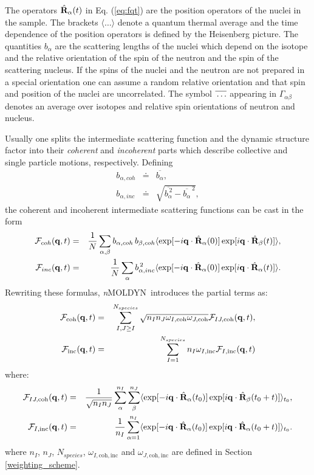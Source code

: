 \documentclass[a4paper,11pt]{report}
\newcommand{\NMOLDYN}{\textit{n}MOLDYN}
\begin{document}
The operators $\hat {\bf R}_\alpha(t)$ in Eq. (\ref{eq:fqt}) are the position operators of the nuclei in the sample. 
The brackets $\langle\ldots\rangle$ denote a quantum thermal average and the time dependence of the position operators 
is defined by the Heisenberg picture.  The quantities $b_\alpha$ are the scattering lengths of the nuclei which depend 
on the isotope and the relative orientation of the spin of the neutron and the spin of the scattering nucleus. If the
spins of the nuclei and the neutron are not prepared in a special orientation one can assume a random relative orientation 
and that spin and position of the nuclei are uncorrelated. The symbol 
$\overline{\rule{0pt}{5pt}\ldots}$ appearing in $\Gamma_{\alpha\beta}$ denotes an average over isotopes and relative spin 
orientations of neutron and nucleus.

Usually one splits the intermediate scattering function and the dynamic structure factor into their {\em coherent} and 
{\em incoherent} parts which describe collective and single particle motions, respectively.
Defining
\begin{eqnarray}
b_{\alpha,coh} &\doteq &\overline{b_\alpha},\\ b_{\alpha,inc} &\doteq
&\sqrt{ \overline{b_\alpha^{\,2}} - \overline{b_\alpha}^{\,2} },
\end{eqnarray}
the coherent and incoherent intermediate scattering functions can be cast in the form
\begin{eqnarray}
{\cal F}_{coh}({\bf q},t) &= &\frac{1}{N}\sum_{\alpha,\beta}
b_{\alpha,coh}\,b_{\beta,coh}
\langle\exp[-i{\bf q}\cdot\hat{\bf R}_\alpha(0)]
       \exp[i{\bf q}\cdot\hat{\bf R}_\beta(t)]\rangle,\\
{\cal F}_{inc}({\bf q},t) &= &\frac{1}{N}\sum_{\alpha}
b_{\alpha,inc}^{\,2}
\langle\exp[-i{\bf q}\cdot\hat{\bf R}_\alpha(0)]
       \exp[i{\bf q}\cdot\hat{\bf R}_\alpha(t)]\rangle.
\end{eqnarray}
Rewriting these formulas, \NMOLDYN\ introduces the partial terms as:
\begin{eqnarray}
\label{eq:fcoh}
{\cal F}_{\mathrm{coh}}({\bf q},t) &= & \sum^{N_{species}}_{I,J \ge I}\sqrt{n_I n_J\omega_{I,\mathrm{coh}}\omega_{J,\mathrm{coh}}}{\cal F}_{IJ,\mathrm{coh}}({\bf q},t),\\
\label{eq:finc}
{\cal F}_{\mathrm{inc}}({\bf q},t) &= &\sum^{N_{species}}_{I = 1}n_I \omega_{I,\mathrm{inc}}{\cal F}_{I,\mathrm{inc}}({\bf q},t)
\end{eqnarray}
where:
\begin{eqnarray}
{\cal F}_{IJ,\mathrm{coh}}({\bf q},t) &= &\frac{1}{\sqrt{n_In_J}}\sum^{n_I}_{\alpha}\sum^{n_J}_{\beta}
\langle\exp[-i{\bf q}\cdot\hat{\bf R}_\alpha(t_0)]
       \exp[i{\bf q}\cdot\hat{\bf R}_\beta(t_0+t)]\rangle_{t_0},\\
{\cal F}_{I,\mathrm{inc}}({\bf q},t) &= & \frac{1}{n_I}\sum^{n_I}_{\alpha = 1}\langle\exp[-i{\bf q}
\cdot\hat{\bf R}_\alpha(t_0)]\exp[i{\bf q}\cdot\hat{\bf R}_\alpha(t_0+t)]\rangle_{t_0}.
\end{eqnarray}
where $n_I$, $n_J$, $N_{species}$, $\omega_{I,\mathrm{coh,inc}}$ and $\omega_{J,\mathrm{coh,inc}}$ are defined in 
Section \ref{weighting_scheme}.
\end{document}
